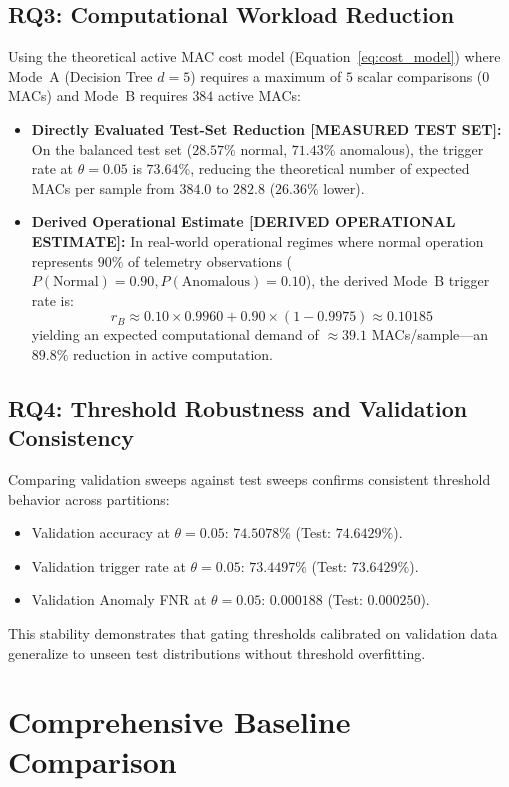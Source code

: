 \documentclass[journal]{IEEEtran}
\begin{document}
\subsection{RQ3: Computational Workload Reduction}
Using the theoretical active MAC cost model (Equation~\ref{eq:cost_model}) where Mode~A (Decision Tree $d=5$) requires a maximum of $5$ scalar comparisons ($0$ MACs) and Mode~B requires $384$ active MACs:
\begin{itemize}
    \item \textbf{Directly Evaluated Test-Set Reduction [MEASURED TEST SET]:} On the balanced test set ($28.57\%$ normal, $71.43\%$ anomalous), the trigger rate at $\theta = 0.05$ is $73.64\%$, reducing the theoretical number of expected MACs per sample from $384.0$ to $282.8$ ($26.36\%$ lower).
    \item \textbf{Derived Operational Estimate [DERIVED OPERATIONAL ESTIMATE]:} In real-world operational regimes where normal operation represents $90\%$ of telemetry observations ($P(\text{Normal}) = 0.90, P(\text{Anomalous}) = 0.10$), the derived Mode~B trigger rate is:
    \begin{equation}
        r_B \approx 0.10 \times 0.9960 + 0.90 \times (1 - 0.9975) \approx 0.10185
    \end{equation}
    yielding an expected computational demand of $\approx 39.1$ MACs/sample---an $\mathbf{89.8\%}$ reduction in active computation.
\end{itemize}

\subsection{RQ4: Threshold Robustness and Validation Consistency}
Comparing validation sweeps against test sweeps confirms consistent threshold behavior across partitions:
\begin{itemize}
    \item Validation accuracy at $\theta = 0.05$: $74.5078\%$ (Test: $74.6429\%$).
    \item Validation trigger rate at $\theta = 0.05$: $73.4497\%$ (Test: $73.6429\%$).
    \item Validation Anomaly FNR at $\theta = 0.05$: $0.000188$ (Test: $0.000250$).
\end{itemize}
This stability demonstrates that gating thresholds calibrated on validation data generalize to unseen test distributions without threshold overfitting.

\section{Comprehensive Baseline Comparison}
\end{document}
